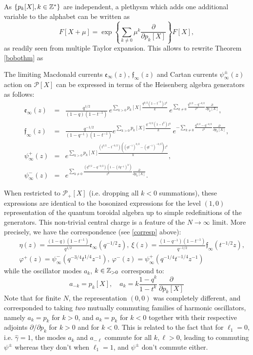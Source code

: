 As $\{p_k[X], k\in{\mathbb Z}^*\}$ are independent, a plethysm which adds one additional variable to the alphabet can be written as
$$F[X+\mu]=\exp\left\{ \sum_{k\neq 0} \mu^k \frac{\partial}{\partial p_k[X]}\right\} F[X], $$
as readily seen from multiple Taylor expansion.
This allows to rewrite Theorem \ref{bobothm} as
\begin{thm}
The limiting Macdonald currents ${\mathfrak e}_\infty(z)$, ${\mathfrak f}_\infty(z)$ and Cartan currents $\psi_\infty^\pm(z)$
action on ${\mathcal P}[X]$ can be expressed in terms of the Heisenberg algebra generators as follows:
\begin{eqnarray*}
{\mathfrak e}_\infty(z)&=&\frac{q^{1/2}}{(1-q)(1-t^{-1})} \, 
e^{\sum_{k> 0} p_k[X] \frac{q^{k/2}(1-t^{-k})z^k}{k}} \, 
e^{\sum_{k\neq 0} \frac{q^{k/2}-q^{-k/2}}{z^k}\frac{\partial}{\partial p_k[X]}}, \nonumber \\
{\mathfrak f}_\infty(z)&=&\frac{q^{-1/2}}{(1-q^{-1})(1-t^{-1})}
e^{\sum_{k>0}p_{k}[X]\frac{q^{-k/2}(1-t^{k})z^{k}}{k} }\,   
e^{-\sum_{k\neq 0} \frac{q^{k/2}-q^{-k/2}}{z^k}\frac{\partial}{\partial p_k[X]}}, \nonumber \\
\psi_\infty^+(z)&=& e^{\sum_{k>0} p_{k}[X]\frac{(t^{k/2}-t^{-k/2})((qt^{-1})^{k/2}-(qt^{-1})^{-k/2})z^k}{k}},\nonumber \\
\psi_\infty^-(z)&=& e^{\sum_{k\neq 0} \frac{(q^{k/2}-q^{-k/2})(1-(t q^{-1})^{k})}{z^{k}}\frac{\partial}{\partial p_k[X]}}.
\nonumber
\end{eqnarray*}
\end{thm}

\begin{remark}
When restricted to ${\mathcal P}_+[X]$ (i.e. dropping all $k<0$ summations), these expressions are identical to the bosonized expressions for the level $(1,0)$ representation of the quantum toroidal algebra \cite{FHHSY} up to simple redefinitions of the generators. This non-trivial central charge is a feature of the $N\to\infty$ limit. 
More precisely, we have the correspondence (see \eqref{corresp} above):
\begin{eqnarray*}
&&\eta(z)=\frac{(1-q)(1-t^{-1})}{q^{1/2}}{\mathfrak e}_\infty(q^{-1/2}z),\ 
\xi(z)=\frac{(1-q^{-1})(1-t^{-1})}{q^{-1/2}}{\mathfrak f}_\infty(t^{-1/2}z),\\ 
&&\varphi^+(z)=\psi_\infty^-(q^{-3/4}t^{1/4}z^{-1}),
\ \varphi^-(z)=\psi_\infty^+(q^{-1/4}t^{-1/4}z^{-1})
\end{eqnarray*}
while the oscillator modes $a_k$, $k\in {\mathbb Z}_{>0}$ correspond to:
$$ a_{-k}=p_k[X],\quad a_k=k\frac{1-q^k}{1-t^k}\,\frac{\partial}{\partial p_k[X]}$$
Note that for finite $N$, the representation $(0,0)$ was completely different, and corresponded to taking 
{\it two} mutually commuting families of harmonic oscillators, namely $a_k=p_k$ for $ k>0$, and $a_k=p_k$ for $k<0$
together with their respective adjoints $\partial/\partial p_k$ for $k>0$ and for $k<0$. 
This is related to the fact that for $\ell_1=0$,
i.e. ${\hat \gamma}=1$, the modes $a_k$ and $a_{-\ell}$ commute for all $k,\ell>0$, leading to commuting $\psi^\pm$
whereas they don't when $\ell_1=1$, and $\psi^\pm$ don't commute either.
\end{remark}


